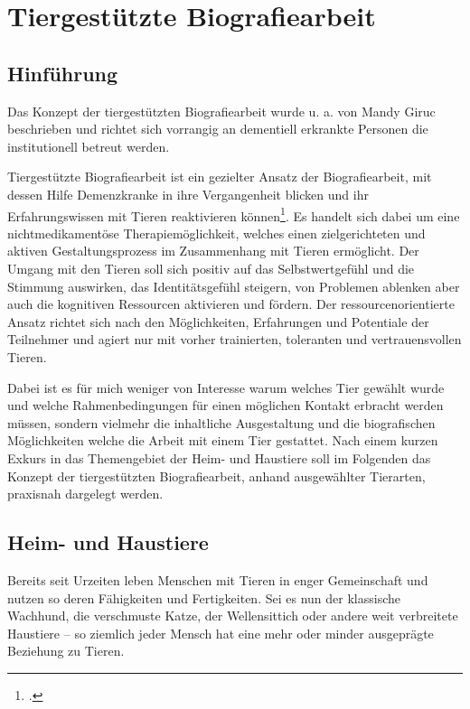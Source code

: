 \section{Tiergestützte Biografiearbeit}
\label{sec:k4_TiergestützteBiografiearbeit}

\subsection{Hinführung}
\label{sec:k4.1_Hinführung}

Das Konzept der tiergestützten Biografiearbeit wurde u. a. von Mandy Giruc beschrieben und richtet sich vorrangig an dementiell erkrankte Personen die institutionell betreut werden.

Tiergestützte Biografiearbeit ist ein gezielter Ansatz der Biografiearbeit, mit dessen Hilfe Demenzkranke in ihre Vergangenheit blicken und ihr Erfahrungswissen mit Tieren reaktivieren können\footcite[vgl.][32f]{Giruc2011}. Es handelt sich dabei um eine nichtmedikamentöse Therapiemöglichkeit, welches einen zielgerichteten und aktiven Gestaltungsprozess im Zusammenhang mit Tieren ermöglicht. Der Umgang mit den Tieren soll sich positiv auf das Selbstwertgefühl und die Stimmung auswirken, das Identitätsgefühl steigern, von Problemen ablenken aber auch die kognitiven Ressourcen aktivieren und fördern. Der ressourcenorientierte Ansatz richtet sich nach den Möglichkeiten, Erfahrungen und Potentiale der Teilnehmer und agiert nur mit vorher trainierten, toleranten und vertrauensvollen Tieren. 

Dabei ist es für mich weniger von Interesse warum welches Tier gewählt wurde und welche Rahmenbedingungen für einen möglichen Kontakt erbracht werden müssen, sondern vielmehr die inhaltliche Ausgestaltung und die biografischen Möglichkeiten welche die Arbeit mit einem Tier gestattet. Nach einem kurzen Exkurs in das Themengebiet der Heim- und Haustiere soll im Folgenden das Konzept der tiergestützten Biografiearbeit, anhand ausgewählter Tierarten, praxisnah dargelegt werden. 

\subsection{Heim- und Haustiere}
\label{sec:k4.2_HeimUndHaustiere}

Bereits seit Urzeiten leben Menschen mit Tieren in enger Gemeinschaft und nutzen so deren Fähigkeiten und Fertigkeiten. Sei es nun der klassische Wachhund, die verschmuste Katze, der Wellensittich oder andere weit verbreitete Haustiere -- so ziemlich jeder Mensch hat eine mehr oder minder ausgeprägte Beziehung zu Tieren. 

